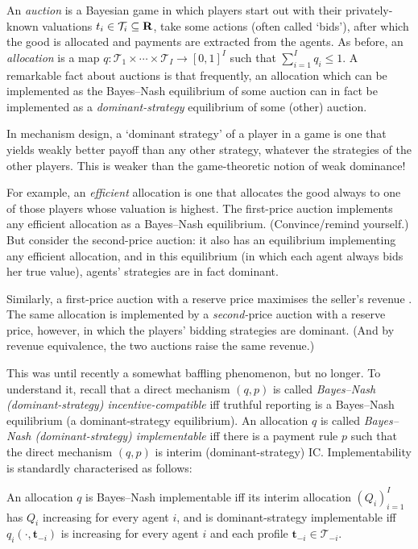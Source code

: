 An \emph{auction} is a Bayesian game in which players start out with their privately-known valuations $t_i \in \mathcal{T}_i \subseteq \mathbf{R}$, take some actions (often called `bids'), after which the good is allocated and payments are extracted from the agents.
As before, an \emph{allocation} is a map $q : \mathcal{T}_1 \times \cdots \times \mathcal{T}_I \to [0,1]^I$ such that $\sum_{i=1}^I q_i \leq 1$.
A remarkable fact about auctions is that frequently, an allocation which can be implemented as the Bayes--Nash equilibrium of some auction
can in fact be implemented as a \emph{dominant-strategy} equilibrium of some (other) auction.%

\begin{namedthm}
	\label{namedthm:dominance}
	In mechanism design, a `dominant strategy' of a player in a game is one that yields weakly better payoff than any other strategy, whatever the strategies of the other players.
	This is weaker than the game-theoretic notion of weak dominance!
\end{namedthm}

For example, an \emph{efficient} allocation is one that allocates the good always to one of those players whose valuation is highest.
The first-price auction implements any efficient allocation as a Bayes--Nash equilibrium. (Convince/remind yourself.)
But consider the second-price auction: it also has an equilibrium implementing any efficient allocation, and in this equilibrium (in which each agent always bids her true value), agents' strategies are in fact dominant.

Similarly, a first-price auction with a reserve price maximises the seller's revenue \parencite{Myerson1981}.
The same allocation is implemented by a \emph{second-}price auction with a reserve price, however, in which the players' bidding strategies are dominant.
(And by revenue equivalence, the two auctions raise the same revenue.)

This was until recently a somewhat baffling phenomenon, but no longer.
To understand it, recall that
a direct mechanism $(q,p)$ is called \emph{Bayes--Nash (dominant-strategy) incentive-compatible} iff truthful reporting is a Bayes--Nash equilibrium (a dominant-strategy equilibrium).
An allocation $q$ is called \emph{Bayes--Nash (dominant-strategy) implementable}
iff there is a payment rule $p$ such that the direct mechanism $(q,p)$ is interim (dominant-strategy) IC.
Implementability is standardly characterised as follows:

\begin{lemma}
	\label{lemma:impl_mon}
	An allocation $q$
	is Bayes--Nash implementable iff its interim allocation $(Q_i)_{i=1}^I$ has $Q_i$ increasing for every agent $i$,
	and is dominant-strategy implementable iff $q_i(\cdot,\boldsymbol{t}_{-i})$ is increasing for every agent $i$ and each profile $\boldsymbol{t}_{-i} \in \mathcal{T}_{-i}$.
\end{lemma}

